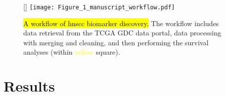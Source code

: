 \documentclass[
paper=landscape,
paper=160mm:90mm, %
fontsize=11pt, %
pagesize, %
parskip=half-, %
]{scrartcl} %
\theoremstyle{mythmstyle} %
\begin{document}
\begin{figure}[ht]
[\FBwidth]
{\texttt{[image: Figure\_1\_manuscript\_workflow.pdf]}} %
{\caption{\hl{A workflow of \acrshort{hnscc} biomarker discovery.}
The workflow includes data retrieval from the TCGA GDC data portal, data processing with merging and cleaning, and then performing the survival analyses (within \textcolor{yellow}{yellow} square).}} %


\end{figure}

\clearpage

\section{Results}
\end{document}
